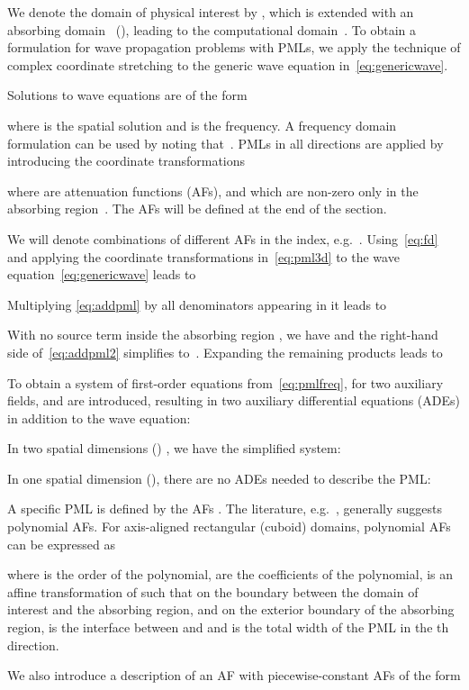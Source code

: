 \documentclass[a4paper]{article}
\begin{document}
We denote the domain of physical interest by , which is
extended with an absorbing domain~ (), leading to the computational domain~.  To obtain a formulation for wave propagation
problems with PMLs, we apply the technique of complex coordinate
stretching \citep{chew94weedon, teixeira00chew} to the generic wave
equation in~\eqref{eq:genericwave}.

Solutions to wave equations are of the form

where  is the spatial solution and  is
the frequency. A frequency domain formulation can be used by noting
that~. PMLs in all directions
are applied by introducing the coordinate transformations

where  are attenuation functions (AFs), and which are
non-zero only in the absorbing region~. The AFs will be
defined at the end of the section.

We will denote combinations of different AFs in the index,
e.g.~.
Using~\eqref{eq:fd} and applying the coordinate transformations
in~\eqref{eq:pml3d} to the wave equation~\eqref{eq:genericwave} leads
to

Multiplying \eqref{eq:addpml} by all denominators appearing in it
leads to

With no source term inside the absorbing region , we have
 and the right-hand side
of~\eqref{eq:addpml2} simplifies to~.  Expanding the
remaining products leads to

To obtain a system of first-order equations from~\eqref{eq:pmlfreq},
for  two auxiliary fields,  and
 are introduced, resulting in two auxiliary
differential equations (ADEs) in addition to the wave equation:

In two spatial dimensions () , we have the simplified system:

In one spatial dimension (), there are no ADEs needed to
describe the PML:


A specific PML is defined by the AFs . The literature,
e.g.~\citep{chew96jin}, generally suggests polynomial AFs. For
axis-aligned rectangular (cuboid) domains, polynomial AFs can be
expressed as

where  is the order of the polynomial,  are the
coefficients of the polynomial,  is an affine
transformation of  such that  on the boundary
between the domain of interest and the absorbing region, and  on the exterior boundary of the absorbing region,  is the interface between  and  and 
is the total width of the PML in the th direction.

We also introduce a description of an AF with  piecewise-constant
AFs of the form
\end{document}
